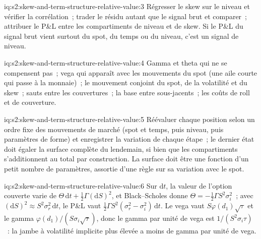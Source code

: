 \begin{solution}{iq:s2:skew-and-term-structure-relative-value:3}
Régresser le skew sur le niveau et vérifier la corrélation~; trader le résidu autant que le signal brut et comparer~; attribuer le P\&L entre les compartiments de niveau et
de skew. Si le P\&L du signal brut vient surtout du spot, du temps ou du niveau, c'est un signal de niveau.
\end{solution}

\begin{solution}{iq:s2:skew-and-term-structure-relative-value:4}
Gamma et theta qui ne se compensent pas~; vega qui apparaît avec les mouvements du spot (une aile courte qui passe à la monnaie)~; le mouvement conjoint du spot, de la volatilité et du skew~; sauts
entre les couvertures~; la base entre sous-jacents~; les coûts de roll et de couverture.
\end{solution}

\begin{solution}{iq:s2:skew-and-term-structure-relative-value:5}
Réévaluer chaque position selon un ordre fixe des mouvements de marché (spot et temps, puis niveau, puis paramètres de forme) et enregistrer la variation de chaque étape~; le dernier
état doit égaler la surface complète du lendemain, si bien que les compartiments s'additionnent au total par construction. La surface doit être une fonction d'un petit nombre de
paramètres, assortie d'une règle sur sa variation avec le spot.
\end{solution}

\begin{solution}{iq:s2:skew-and-term-structure-relative-value:6}
Sur $\mathrm{d}t$, la valeur de l'option couverte varie de $\Theta\,\mathrm{d}t + \tfrac12\Gamma(\mathrm{d}S)^2$, et Black--Scholes donne $\Theta =
-\tfrac12\Gamma S^2\sigma_i^2$~; avec $(\mathrm{d}S)^2 \approx S^2\sigma_r^2\,\mathrm{d}t$, le P\&L vaut $\tfrac12\Gamma S^2(\sigma_r^2 -
\sigma_i^2)\,\mathrm{d}t$. Le vega vaut $S\varphi(d_1)\sqrt\tau$ et le gamma $\varphi(d_1)/(S\sigma_i\sqrt\tau)$, donc le gamma par unité de vega est
$1/(S^2\sigma_i\tau)$~: la jambe à volatilité implicite plus élevée a moins de gamma par unité de vega.
\end{solution}
